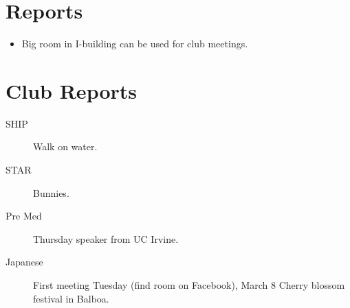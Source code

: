 \documentclass{article}
\begin{document}
\section{Reports}
\begin{itemize}
\item Big room in I-building can be used for club meetings.
\end{itemize}
\section{Club Reports}
\begin{description}
\item[SHIP] Walk on water.
\item[STAR] Bunnies.
\item[Pre Med] Thursday speaker from UC Irvine.
\item[Japanese] First meeting Tuesday (find room on Facebook), March 8 Cherry blossom festival in Balboa.
\end{description}
\end{document}
